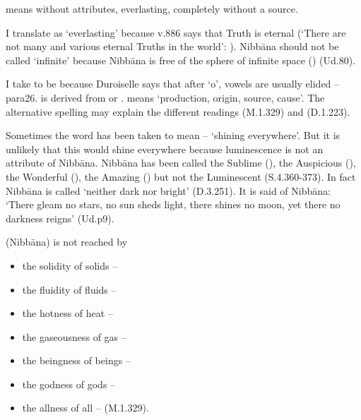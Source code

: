  means  without attributes, everlasting, completely without a source.

I translate  as `everlasting' because v.886 says that Truth is eternal (`There are not many and various eternal Truths in the world': ). Nibbāna should not be called `infinite' because Nibbāna is free of the sphere of infinite space () (Ud.80).

I take  to be  because Duroiselle says that after `o', vowels are usually elided -- para26.  is derived from  or .  means `production, origin, source, cause'. The  alternative spelling may explain the different readings  (M.1.329) and  (D.1.223).

Sometimes the word  has been taken to mean  -- `shining everywhere'. But it is unlikely that this  would shine everywhere because luminescence is not an attribute of Nibbāna. Nibbāna has been called the Sublime (), the Auspicious (), the Wonderful (), the Amazing () but not the Luminescent (S.4.360-373). In fact Nibbāna is called `neither dark nor bright' (D.3.251). It is said of Nibbāna: `There gleam no stars, no sun sheds light, there shines no moon, yet there no darkness reigns' (Ud.p9).

 (Nibbāna) is not reached by

\begin{itemize}
\item the solidity of solids -- 
\item the fluidity of fluids -- 
\item the hotness of heat -- 
\item the gaseousness of gas -- 
\item the beingness of beings -- 
\item the godness of gods -- 
\item the allness of all --  (M.1.329).
\end{itemize}

